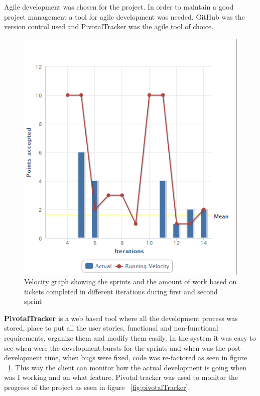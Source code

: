 Agile development was chosen for the project. In order to maintain a good project management a tool for
agile development was needed. GitHub \cite{github} was the version control used and PivotalTracker \cite{pivotal}
was the agile tool of choice.

\begin{figure}[htp]
\centering
\includegraphics[scale=0.8]{Figures/pivotalGraph.png}
\caption{Velocity graph showing the sprints and the amount of work based on tickets completed in different iterations during first and second sprint}
\label{fig:pivotalGraph}
\end{figure}

\textbf{PivotalTracker} is a web based tool where all the development process was stored, place to put all the user stories, functional
and non-functional requirements, organize them and modify them easily. In the system it was easy to see when were the development bursts for the sprints and when was the post development time, when bugs were fixed, code was re-factored as seen in figure ~\ref{fig:pivotalGraph}.
This way the client can monitor how the actual development is going when was I working and on what feature. Pivotal tracker was used to monitor the progress
of the project as seen in figure ~\ref{fig:pivotalTracker}.

